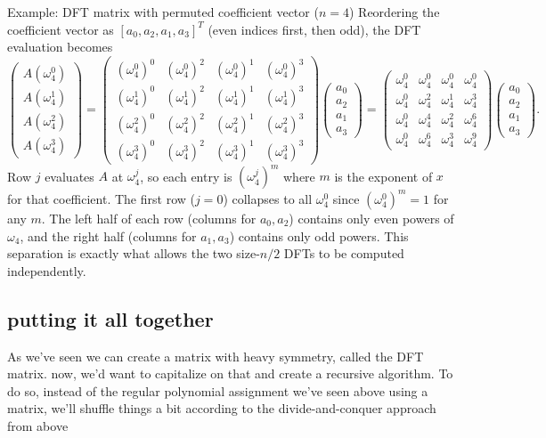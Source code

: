 \begin{examplebox}{Example: DFT matrix with permuted coefficient vector ($n=4$)}
Reordering the coefficient vector as $[a_0, a_2, a_1, a_3]^T$ (even indices first, then odd), the DFT evaluation becomes
$$
\begin{pmatrix} A(\omega_4^0) \\ A(\omega_4^1) \\ A(\omega_4^2) \\ A(\omega_4^3) \end{pmatrix}
=
\begin{pmatrix}
  (\omega_4^0)^0 & (\omega_4^0)^2 & (\omega_4^0)^1 & (\omega_4^0)^3 \\
  (\omega_4^1)^0 & (\omega_4^1)^2 & (\omega_4^1)^1 & (\omega_4^1)^3 \\
  (\omega_4^2)^0 & (\omega_4^2)^2 & (\omega_4^2)^1 & (\omega_4^2)^3 \\
  (\omega_4^3)^0 & (\omega_4^3)^2 & (\omega_4^3)^1 & (\omega_4^3)^3
\end{pmatrix}
\begin{pmatrix} a_0 \\ a_2 \\ a_1 \\ a_3 \end{pmatrix}
=
\begin{pmatrix}
  \omega_4^0 & \omega_4^0 & \omega_4^0 & \omega_4^0 \\
  \omega_4^0 & \omega_4^2 & \omega_4^1 & \omega_4^3 \\
  \omega_4^0 & \omega_4^4 & \omega_4^2 & \omega_4^6 \\
  \omega_4^0 & \omega_4^6 & \omega_4^3 & \omega_4^9
\end{pmatrix}
\begin{pmatrix} a_0 \\ a_2 \\ a_1 \\ a_3 \end{pmatrix}.
$$
Row $j$ evaluates $A$ at $\omega_4^j$, so each entry is $(\omega_4^j)^m$ where $m$ is the exponent of $x$ for that coefficient.
The first row ($j=0$) collapses to all $\omega_4^0$ since $(\omega_4^0)^m = 1$ for any $m$.
The left half of each row (columns for $a_0, a_2$) contains only even powers of $\omega_4$,
and the right half (columns for $a_1, a_3$) contains only odd powers.
This separation is exactly what allows the two size-$n/2$ DFTs to be computed independently.
\end{examplebox}

\subsection{putting it all together}
As we've seen we can create a matrix with heavy symmetry, called the DFT matrix. 
now, we'd want to capitalize on that and create a recursive algorithm.
To do so, instead of the regular polynomial assignment we've seen above using a matrix,  
we'll shuffle things a bit according to the divide-and-conquer approach from above

